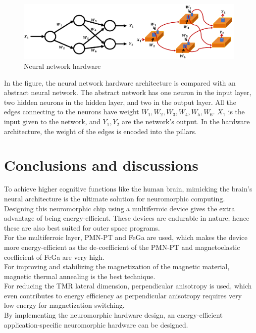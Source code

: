 \documentclass[12pt,a4paper,bold]{thesis}
\theoremstyle{thm}
\theoremstyle{definition}
\begin{document}
\begin{figure}[H]
	\centering
   \includegraphics[width=13cm]{Images/57.png} 
   \caption{Neural network hardware}
\end{figure}
In the figure, the neural network hardware architecture is compared with an abstract neural network. The abstract network has one neuron in the input layer, two hidden neurons in the hidden layer, and two in the output layer. All the edges connecting to the neurons have weight $W_1, W_2, W_3, W_4, W_5, W_6$. $X_1$ is the input given to the network, and $Y_1, Y_2$ are the network's output.
In the hardware architecture, the weight of the edges is encoded into the pillars. 
\chapter{Conclusions and discussions} \label{ch: conclusions}
To achieve higher cognitive functions like the human brain, mimicking the brain's neural architecture is the ultimate solution for neuromorphic computing. Designing this neuromorphic chip using a multiferroic device gives the extra advantage of being energy-efficient. These devices are endurable in nature; hence these are also best suited for outer space programs. \\
For the multiferroic layer, PMN-PT and FeGa are used, which makes the device more energy-efficient as the de-coefficient of the PMN-PT and magnetoelastic coefficient of FeGa are very high.\\
For improving and stabilizing the magnetization of the magnetic material, magnetic thermal annealing is the best technique.\\
For reducing the TMR lateral dimension, perpendicular anisotropy is used, which even contributes to energy efficiency as perpendicular anisotropy requires very low energy for magnetization switching.\\
By implementing the neuromorphic hardware design, an energy-efficient application-specific neuromorphic hardware can be designed.
\end{document}
